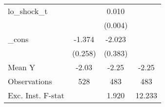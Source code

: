 {\begin{tabular}{l*{3}{c}}
\addlinespace
lo\_shock\_t  &                     &       0.010\sym{**} &                     \\
            &                     &     (0.004)         &                     \\
\addlinespace
\_cons      &      -1.374\sym{***}&      -2.023\sym{***}&                     \\
            &     (0.258)         &     (0.383)         &                     \\
\midrule
Mean Y      &       -2.03         &       -2.25         &       -2.25         \\
Observations&         528         &         483         &         483         \\
Exc. Inst. F-stat&                     &       1.920         &      12.233         \\
\bottomrule
\end{tabular}
}
